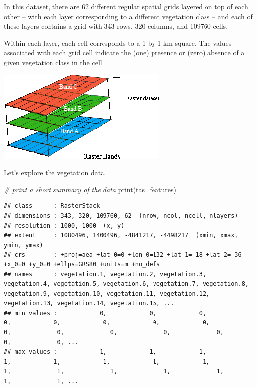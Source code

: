 \documentclass[
  12pt,
]{book}
\newenvironment{Shaded}{\begin{snugshade}}{\end{snugshade}}
\newcommand{\CommentTok}[1]{\textcolor[rgb]{0.56,0.35,0.01}{\textit{#1}}}
\newcommand{\FunctionTok}[1]{\textcolor[rgb]{0.00,0.00,0.00}{#1}}
\newcommand{\NormalTok}[1]{#1}
\begin{document}
In this dataset, there are 62 different regular spatial grids layered on top of each other -- with each layer corresponding to a different vegetation class -- and each of these layers contains a grid with 343 rows, 320 columns, and 109760 cells.

Within each layer, each cell corresponds to a 1 by 1 km square. The values associated with each grid cell indicate the (one) presence or (zero) absence of a given vegetation class in the cell.

\includegraphics{images/rasterbands.png}

Let's explore the vegetation data.

\begin{Shaded}
\begin{Highlighting}[]
\CommentTok{\# print a short summary of the data}
\FunctionTok{print}\NormalTok{(tas\_features)}
\end{Highlighting}
\end{Shaded}

\begin{verbatim}
## class      : RasterStack 
## dimensions : 343, 320, 109760, 62  (nrow, ncol, ncell, nlayers)
## resolution : 1000, 1000  (x, y)
## extent     : 1080496, 1400496, -4841217, -4498217  (xmin, xmax, ymin, ymax)
## crs        : +proj=aea +lat_0=0 +lon_0=132 +lat_1=-18 +lat_2=-36 +x_0=0 +y_0=0 +ellps=GRS80 +units=m +no_defs 
## names      : vegetation.1, vegetation.2, vegetation.3, vegetation.4, vegetation.5, vegetation.6, vegetation.7, vegetation.8, vegetation.9, vegetation.10, vegetation.11, vegetation.12, vegetation.13, vegetation.14, vegetation.15, ... 
## min values :            0,            0,            0,            0,            0,            0,            0,            0,            0,             0,             0,             0,             0,             0,             0, ... 
## max values :            1,            1,            1,            1,            1,            1,            1,            1,            1,             1,             1,             1,             1,             1,             1, ...
\end{verbatim}
\end{document}
